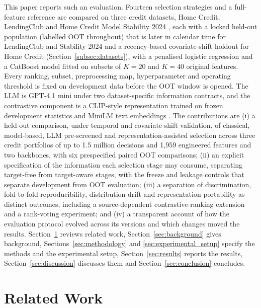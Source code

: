 \documentclass[final,5p,twocolumn]{elsarticle}
\newcommand{\Kfeat}{K}
\begin{document}
This paper reports such an evaluation. Fourteen selection strategies and a full-feature reference are compared on three credit datasets, Home Credit, LendingClub and Home Credit Model Stability 2024 \cite{homecredit2018,lendingclub_kaggle,homecredit2024}, each with a locked held-out population (labelled OOT throughout) that is later in calendar time for LendingClub and Stability 2024 and a recency-based covariate-shift holdout for Home Credit (Section~\ref{subsec:datasets}), with a penalised logistic regression and a CatBoost model \cite{prokhorenkova2018} fitted on subsets of $\Kfeat=20$ and $\Kfeat=40$ original features. Every ranking, subset, preprocessing map, hyperparameter and operating threshold is fixed on development data before the OOT window is opened. The LLM is GPT-4.1 mini \cite{openai2025gpt41} under two dataset-specific information contracts, and the contrastive component is a CLIP-style representation trained on frozen development statistics and MiniLM text embeddings \cite{wang2020minilm,reimers2019}. The contributions are (i) a held-out comparison, under temporal and covariate-shift validation, of classical, model-based, LLM pre-screened and representation-assisted selection across three credit portfolios of up to 1.5 million decisions and 1,959 engineered features and two backbones, with six prespecified paired OOT comparisons; (ii) an explicit specification of the information each selection stage may consume, separating target-free from target-aware stages, with the freeze and leakage controls that separate development from OOT evaluation; (iii) a separation of discrimination, fold-to-fold reproducibility, distribution drift and representation portability as distinct outcomes, including a source-dependent contrastive-ranking extension and a rank-voting experiment; and (iv) a transparent account of how the evaluation protocol evolved across its versions and which changes moved the results. Section~\ref{sec:related_work} reviews related work, Section~\ref{sec:background} gives background, Sections~\ref{sec:methodology} and \ref{sec:experimental_setup} specify the methods and the experimental setup, Section~\ref{sec:results} reports the results, Section~\ref{sec:discussion} discusses them and Section~\ref{sec:conclusion} concludes.


\section{Related Work}
\label{sec:related_work}
\end{document}
